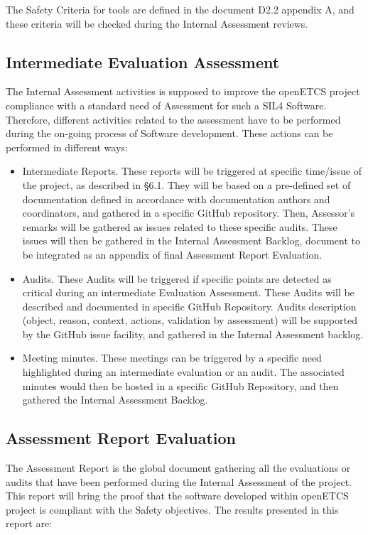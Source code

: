 \documentclass[openetcs]{template/openetcs_article}
\begin{document}
The Safety Criteria for tools are defined in the document D2.2 appendix A, and these criteria will be checked during the Internal Assessment reviews. 

\subsection{Intermediate Evaluation Assessment}
The Internal Assessment activities is supposed to improve the openETCS project compliance with a standard need of Assessment for such a SIL4 Software.
Therefore, different activities related to the assessment have to be performed during the on-going process of Software development. These actions can be performed in different ways:

\begin{itemize}
\item Intermediate Reports. These reports will be triggered at specific time/issue of the project, as described in §6.1. They will be based on a pre-defined set
of documentation defined in accordance with documentation authors and coordinators, and gathered in a specific GitHub repository. Then, Assessor's remarks will
be gathered as issues related to these specific audits. These issues will then be gathered in the Internal Assessment Backlog, document to be integrated as an
appendix of final Assessment Report Evaluation.
\item Audits. These Audits will be triggered if specific points are detected as critical during an intermediate Evaluation Assessment. These Audits will be
described and documented in specific GitHub Repository. Audits description (object, reason, context, actions, validation by assessment) will be supported by the
GitHub issue facility, and gathered in the Internal Assessment backlog.
\item Meeting minutes. These meetings can be triggered by a specific need highlighted during an intermediate evaluation or an audit. The associated minutes
would then be hosted in a specific GitHub Repository, and then gathered the Internal Assessment Backlog.
\end{itemize}


\subsection{Assessment Report Evaluation}
The Assessment Report is the global document gathering all the evaluations or audits that have been performed during the Internal Assessment of the project.
This report will bring the proof that the software developed within openETCS project is compliant with the Safety objectives.
The results presented in this report are:
\end{document}
